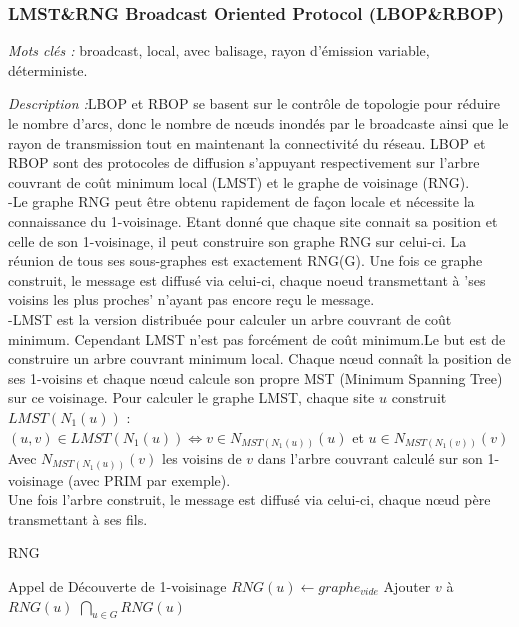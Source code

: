 \subsubsection{LMST\&RNG Broadcast Oriented Protocol (LBOP\&RBOP)\cite{Cartigny2005}}

\emph{Mots clés :} broadcast, local, avec balisage, rayon d'émission variable, déterministe.

\emph{Description :}LBOP et RBOP se basent sur le contrôle de topologie pour réduire le nombre d'arcs, donc 
le nombre de nœuds inondés par le broadcaste ainsi que le rayon de transmission tout en maintenant la connectivité
du réseau. LBOP et RBOP sont des protocoles de diffusion s'appuyant respectivement sur l'arbre couvrant de 
coût minimum local (LMST) et le graphe de voisinage (RNG).\\

-Le graphe RNG peut être obtenu rapidement de façon locale et nécessite la connaissance du 1-voisinage. Etant donné
que chaque site connait sa position et celle de son 1-voisinage, il peut construire son graphe RNG sur celui-ci. La
réunion de tous ses sous-graphes est exactement RNG(G). Une fois ce graphe construit, le message est diffusé via 
celui-ci, chaque noeud  transmettant à 'ses voisins les plus proches' n'ayant pas encore reçu le message.\\

-LMST est la version distribuée pour calculer un arbre couvrant de coût minimum. Cependant LMST n'est pas forcément de 
coût minimum.Le but est de construire un arbre couvrant minimum local. Chaque nœud connaît la position de ses 1-voisins 
 et chaque nœud calcule son propre MST (Minimum Spanning Tree) sur ce voisinage.
Pour calculer le graphe LMST, chaque site $u$ construit $LMST(N_1(u))$ : \\
 $(u,v) \in LMST(N_1(u)) \Leftrightarrow v \in N_{MST(N_1(u))}(u)$ et $ u \in N_{MST(N_1(v))}(v)$\\
Avec $N_{MST(N_1(u))}(v)$ les voisins de $v$ dans l'arbre couvrant calculé sur son 1-voisinage (avec PRIM par exemple).\\
Une fois l'arbre construit, le message est diffusé via celui-ci, chaque nœud père transmettant à ses fils.




\begin{algorithm}[h]
\caption{RNG}
\label{RNG}
\begin{algorithmic}
	\STATE Appel de Découverte de 1-voisinage
\ENDFOR
{}
	\STATE  $RNG(u) \leftarrow graphe_{vide}$
	    \STATE Ajouter $v$ à $RNG(u)$
	  \ENDIF
        \ENDFOR
\ENDFOR
\RETURN $\bigcap_{u \in G} RNG(u)$
\end{algorithmic}
\end{algorithm}

